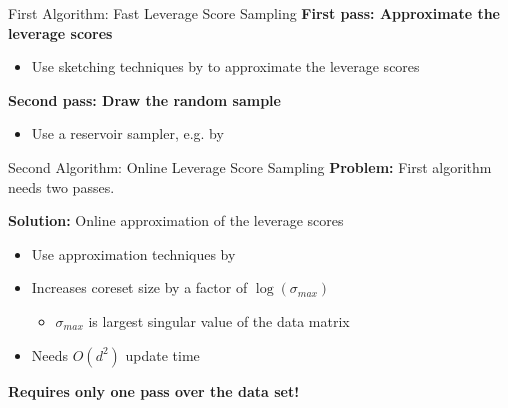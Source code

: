 \documentclass[gray]{beamer}
\begin{document}
\begin{frame}{First Algorithm: Fast Leverage Score Sampling}\pause
    \textbf{First pass: Approximate the leverage scores}
    \begin{itemize}
        \item Use sketching techniques by \cite{woodruff-2017} to
              approximate the leverage scores
    \end{itemize}

    \pause

    \vspace{\fill}

    \textbf{Second pass: Draw the random sample}
    \begin{itemize}
        \item Use a reservoir sampler, e.g. by \cite{reservoir-sampler}
    \end{itemize}

    \pause

    \vspace{\fill}

    \centering
\end{frame}

\begin{frame}{Second Algorithm: Online Leverage Score Sampling} \pause
    \textbf{Problem:} First algorithm needs two passes.

    \pause

    \vspace{\fill}

    \textbf{Solution:} Online approximation of the leverage scores
    \begin{itemize}
        \item Use approximation techniques by \cite{tensor-factorization}
        \item Increases coreset size by a factor of $\log(\sigma_{max})$
              \begin{itemize}
                  \item $\sigma_{max}$ is largest singular value of the data matrix
              \end{itemize}
        \item Needs $O(d^2)$ update time
    \end{itemize}

    \pause

    \vspace{\fill}

    \textbf{Requires only one pass over the data set!}
\end{frame}
\end{document}
